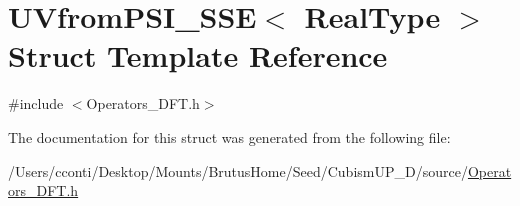 \hypertarget{struct_u_vfrom_p_s_i___s_s_e}{}\section{U\+Vfrom\+P\+S\+I\+\_\+\+S\+S\+E$<$ Real\+Type $>$ Struct Template Reference}
\label{struct_u_vfrom_p_s_i___s_s_e}


{\ttfamily \#include $<$Operators\+\_\+\+D\+F\+T.\+h$>$}



The documentation for this struct was generated from the following file\+:\begin{DoxyCompactItemize}
\item 
/\+Users/cconti/\+Desktop/\+Mounts/\+Brutus\+Home/\+Seed/\+Cubism\+U\+P\+\_\+D/source/\hyperlink{_operators___d_f_t_8h}{Operators\+\_\+\+D\+F\+T.\+h}\end{DoxyCompactItemize}
